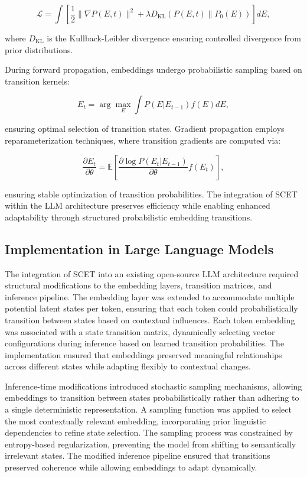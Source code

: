 \documentclass{article}
\begin{document}
\begin{equation}
	\mathcal{L} = \int \left[ \frac{1}{2} \|\nabla P(E,t)\|^2 + \lambda D_{\text{KL}}(P(E,t) \| P_0(E)) \right] dE,
\end{equation}

where \( D_{\text{KL}} \) is the Kullback-Leibler divergence ensuring controlled divergence from prior distributions.

During forward propagation, embeddings undergo probabilistic sampling based on transition kernels:

\begin{equation}
	E_t = \arg\max_{E} \int P(E | E_{t-1}) f(E) dE,
\end{equation}

ensuring optimal selection of transition states. Gradient propagation employs reparameterization techniques, where transition gradients are computed via:

\begin{equation}
	\frac{\partial E_t}{\partial \theta} = \mathbb{E} \left[ \frac{\partial \log P(E_t | E_{t-1})}{\partial \theta} f(E_t) \right],
\end{equation}

ensuring stable optimization of transition probabilities. The integration of SCET within the LLM architecture preserves efficiency while enabling enhanced adaptability through structured probabilistic embedding transitions.


\subsection{Implementation in Large Language Models}

The integration of SCET into an existing open-source LLM architecture required structural modifications to the embedding layers, transition matrices, and inference pipeline. The embedding layer was extended to accommodate multiple potential latent states per token, ensuring that each token could probabilistically transition between states based on contextual influences. Each token embedding was associated with a state transition matrix, dynamically selecting vector configurations during inference based on learned transition probabilities. The implementation ensured that embeddings preserved meaningful relationships across different states while adapting flexibly to contextual changes.

Inference-time modifications introduced stochastic sampling mechanisms, allowing embeddings to transition between states probabilistically rather than adhering to a single deterministic representation. A sampling function was applied to select the most contextually relevant embedding, incorporating prior linguistic dependencies to refine state selection. The sampling process was constrained by entropy-based regularization, preventing the model from shifting to semantically irrelevant states. The modified inference pipeline ensured that transitions preserved coherence while allowing embeddings to adapt dynamically.
\end{document}
